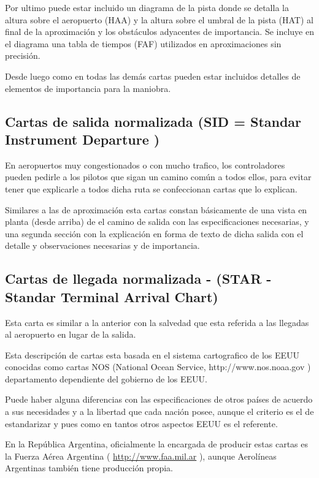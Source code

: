 Por ultimo puede estar incluido un diagrama de la pista donde se detalla la
altura sobre el aeropuerto (HAA) y la altura sobre el umbral de la pista (HAT)
al final de la aproximaci\'on y los obst\'aculos adyacentes de importancia. Se incluye en el diagrama una tabla de tiempos (FAF) utilizados en aproximaciones sin
precisi\'on.

Desde luego como en todas las dem\'as cartas pueden estar incluidos detalles de
elementos de importancia para la maniobra.

\subsection{Cartas de salida normalizada  (SID = Standar Instrument Departure )}
\label{sec:cartas-de-salida-normalizada}


En aeropuertos muy congestionados o con mucho trafico, los controladores
pueden pedirle a los pilotos que sigan un camino com\'un a todos ellos, para
evitar tener que explicarle a todos dicha ruta se confeccionan cartas que lo
explican.

Similares a las de aproximaci\'on esta cartas constan b\'asicamente de una vista
en planta (desde arriba) de el camino de salida con las especificaciones
necesarias, y una segunda secci\'on con la explicaci\'on en forma de texto de
dicha salida con el detalle y observaciones necesarias y de importancia.

\subsection{Cartas de llegada normalizada - (STAR - Standar Terminal Arrival Chart)}
\label{sec:cartas-de-llegada-normalizada}


Esta carta es similar a la anterior con la salvedad que esta referida a las
llegadas al aeropuerto en lugar de la salida.

Esta descripci\'on de cartas esta basada en el sistema cartografico de los EEUU
conocidas como cartas NOS (National Ocean Service, http://www.nos.noaa.gov )
departamento dependiente del gobierno de los EEUU.

Puede haber alguna diferencias con las especificaciones de otros pa\'ises de
acuerdo a sus necesidades y a la libertad que cada naci\'on posee, aunque el
criterio es el de estandarizar y pues como en tantos otros aspectos EEUU es el
referente.

En la Rep\'ublica Argentina, oficialmente la encargada de producir estas cartas
es la Fuerza A\'erea Argentina (
\url{http://www.faa.mil.ar} 
), aunque Aerol\'ineas
Argentinas tambi\'en tiene producci\'on propia.

